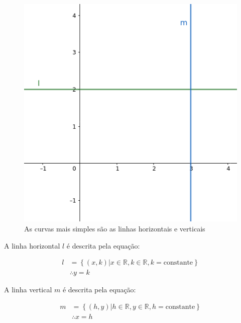 \documentclass[pdftex, brazil, 12pt, twoside]{article}
\begin{document}
\begin{figure}[ht]
  \begin{center}
    \caption{As curvas mais simples são as linhas horizontais e verticais}
    \label{fig:curvas-simples}
    \includegraphics[scale=0.5]{imagens/curvas-simples.png}
    
  \end{center}
\end{figure}

A linha horizontal $l$ é descrita pela equação:

\begin{equation}
  \begin{split}
               l & = \left\{(x, k) | x \in \mathbb{R}, k \in \mathbb{R}, k = \text{constante}\right\}\\
                 & \therefore y = k
  \end{split}
\end{equation}

A linha vertical $m$ é descrita pela equação:

\begin{equation}
  \begin{split}
               m & = \left\{(h, y) | h \in \mathbb{R}, y \in \mathbb{R}, h = \text{constante}\right\}\\
                 & \therefore x = h
  \end{split}
\end{equation}
\end{document}
